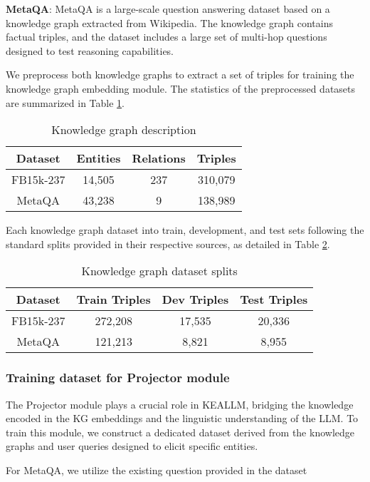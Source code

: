 \textbf{MetaQA}\cite{zhang2018variational}: MetaQA is a large-scale question answering dataset based on a knowledge graph extracted from Wikipedia. The knowledge graph contains factual triples, and the dataset includes a large set of multi-hop questions designed to test reasoning capabilities.

We preprocess both knowledge graphs to extract a set of triples for training the knowledge graph embedding module. The statistics of the preprocessed datasets are summarized in Table \ref{table:dataset_stats}.
\begin{table}[hbt]
\centering
\caption{Knowledge graph description}
\label{table:dataset_stats}
\begin{tabular}{|c|c|c|c|}
\hline
\textbf{Dataset} & \textbf{Entities} & \textbf{Relations} & \textbf{Triples} \\
\hline
FB15k-237 & 14,505 & 237 & 310,079 \\
\hline
MetaQA & 43,238 & 9 & 138,989 \\
\hline
\end{tabular}
\end{table}
Each knowledge graph dataset into train, development, and test sets following the standard splits provided in their respective sources, as detailed in Table \ref{table:dataset_splits}.
\begin{table}[hbt]
\centering
\caption{Knowledge graph dataset splits}
\label{table:dataset_splits}
\begin{tabular}{|c|c|c|c|}
\hline
\textbf{Dataset} & \textbf{Train Triples} & \textbf{Dev Triples} & \textbf{Test Triples} \\
\hline
FB15k-237  & 272,208 & 17,535 & 20,336 \\
\hline
MetaQA  & 121,213 & 8,821 & 8,955 \\
\hline
\end{tabular}
\end{table}

\subsubsection{Training dataset for Projector module}
The Projector module plays a crucial role in KEALLM, bridging the knowledge encoded in the KG embeddings and the linguistic understanding of the LLM. To train this module, we construct a dedicated dataset derived from the knowledge graphs and user queries designed to elicit specific entities.

For MetaQA, we utilize the existing question provided in the dataset

